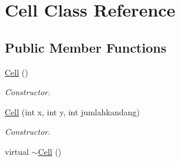 \hypertarget{class_cell}{}\section{Cell Class Reference}
\label{class_cell}
\subsection*{Public Member Functions}
\begin{DoxyCompactItemize}
\item 
\hyperlink{class_cell_a394510643e8664cf12b5efaf5cb99f71}{Cell} ()\hypertarget{class_cell_a394510643e8664cf12b5efaf5cb99f71}{}\label{class_cell_a394510643e8664cf12b5efaf5cb99f71}

\begin{DoxyCompactList}\small\item\em Constructor. \end{DoxyCompactList}\item 
\hyperlink{class_cell_a884a55d8e435243137cc798aeab2ab81}{Cell} (int x, int y, int jumlahkandang)
\begin{DoxyCompactList}\small\item\em Constructor. \end{DoxyCompactList}\item 
virtual \hyperlink{class_cell_a9fa559f7a28e2b4336c6879ca09304d8}{$\sim$\+Cell} ()\hypertarget{class_cell_a9fa559f7a28e2b4336c6879ca09304d8}{}\label{class_cell_a9fa559f7a28e2b4336c6879ca09304d8}


\end{DoxyCompactItemize}
